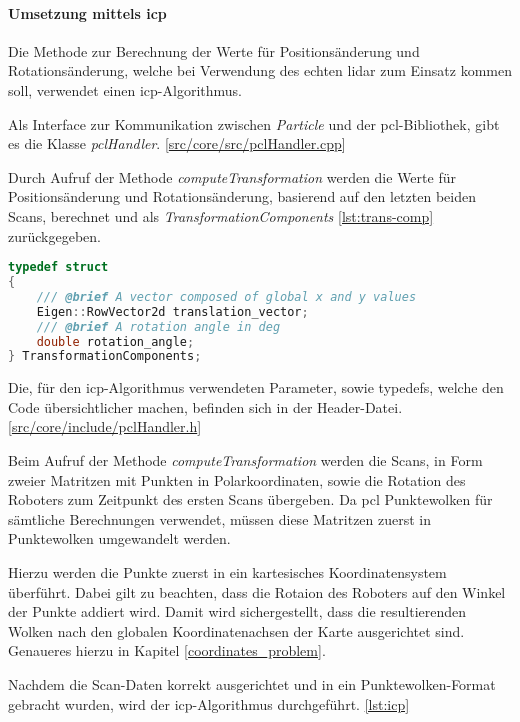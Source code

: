 \paragraph{Umsetzung mittels \ac{icp}} \mbox{}
Die Methode zur Berechnung der Werte für Positionsänderung und Rotationsänderung,
welche bei Verwendung des echten \ac{lidar} zum Einsatz kommen soll, verwendet einen \ac{icp}-Algorithmus.

Als Interface zur Kommunikation zwischen \textit{Particle} und der \ac{pcl}-Bibliothek, gibt es die Klasse \textit{pclHandler}.
[\href{https://github.com/Jundy0/Studienarbeit/blob/main/src/core/src/pclHandler.cpp}{src/core/src/pclHandler.cpp}]

Durch Aufruf der Methode \textit{computeTransformation} werden die Werte für Positionsänderung und Rotationsänderung, 
basierend auf den letzten beiden Scans, berechnet und als \textit{TransformationComponents} \ref{lst:trans-comp} zurückgegeben.

\begin{lstlisting}[caption={Aufbau \textit{TransformationComponents}},label={lst:trans-comp},language={C++}]
typedef struct
{
    /// @brief A vector composed of global x and y values
    Eigen::RowVector2d translation_vector;
    /// @brief A rotation angle in deg
    double rotation_angle;
} TransformationComponents;
\end{lstlisting}

Die, für den \ac{icp}-Algorithmus verwendeten Parameter, sowie typedefs, welche den Code übersichtlicher machen, befinden sich in der Header-Datei.
[\href{https://github.com/Jundy0/Studienarbeit/blob/main/src/core/include/pclHandler.h}{src/core/include/pclHandler.h}]

Beim Aufruf der Methode \textit{computeTransformation} werden die Scans, in Form zweier Matritzen mit Punkten in Polarkoordinaten, 
sowie die Rotation des Roboters zum Zeitpunkt des ersten Scans übergeben.
Da \ac{pcl} Punktewolken für sämtliche Berechnungen verwendet, müssen diese Matritzen zuerst in Punktewolken umgewandelt werden.

Hierzu werden die Punkte zuerst in ein kartesisches Koordinatensystem überführt.
Dabei gilt zu beachten, dass die Rotaion des Roboters auf den Winkel der Punkte addiert wird.
Damit wird sichergestellt, dass die resultierenden Wolken nach den globalen Koordinatenachsen der Karte ausgerichtet sind.
Genaueres hierzu in Kapitel \ref{coordinates_problem}.

Nachdem die Scan-Daten korrekt ausgerichtet und in ein Punktewolken-Format gebracht wurden, wird der \ac{icp}-Algorithmus durchgeführt. \ref{lst:icp}

